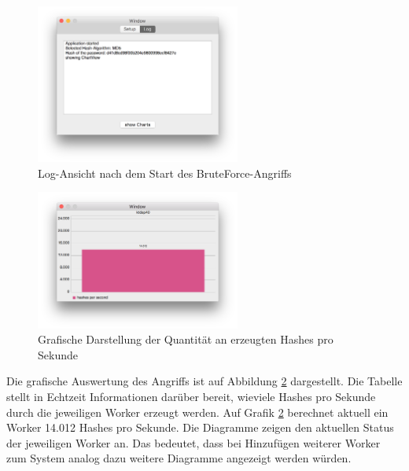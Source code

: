 \begin{figure}[!ht]
	\centering
		\includegraphics[natwidth=1200pt, natheight=349pt, width=0.6\textwidth]{images/logView.png}
		\caption{Log-Ansicht nach dem Start des BruteForce-Angriffs}
	\label{fig:logView}
\end{figure}

\begin{figure}[!ht]
	\centering
		\includegraphics[natwidth=1200pt, natheight=349pt, width=0.6\textwidth]{images/chartView.png}
		\caption{Grafische Darstellung der Quantität an erzeugten Hashes pro Sekunde}
	\label{fig:chartView}
\end{figure}

Die grafische Auswertung des Angriffs ist auf Abbildung \ref{fig:chartView} dargestellt. Die Tabelle stellt in Echtzeit Informationen darüber bereit, wieviele Hashes pro Sekunde durch die jeweiligen Worker erzeugt werden. Auf Grafik \ref{fig:chartView} berechnet aktuell ein Worker 14.012 Hashes pro Sekunde. Die Diagramme zeigen den aktuellen Status der jeweiligen Worker an. Das bedeutet, dass bei Hinzufügen weiterer Worker zum System analog dazu weitere Diagramme angezeigt werden würden. 

